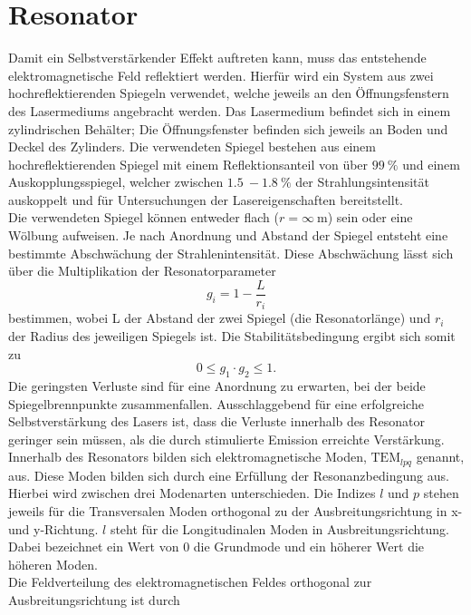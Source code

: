\section{Resonator}

Damit ein Selbstverstärkender Effekt auftreten kann, muss das entstehende elektromagnetische Feld reflektiert werden. Hierfür wird ein System aus zwei
hochreflektierenden Spiegeln verwendet, welche jeweils an den Öffnungsfenstern des Lasermediums angebracht werden. Das Lasermedium befindet sich in einem 
zylindrischen Behälter; Die Öffnungsfenster befinden sich jeweils an Boden und Deckel des Zylinders. Die verwendeten Spiegel bestehen aus einem hochreflektierenden
Spiegel mit einem Reflektionsanteil von über $\qty{99}{\%}$ und einem Auskopplungsspiegel, welcher zwischen $\qty{1.5}{}-\qty{1.8}{\%}$ der Strahlungsintensität
auskoppelt und für Untersuchungen der Lasereigenschaften bereitstellt.\\
Die verwendeten Spiegel können entweder flach ($r = \infty\qty{}{\metre}$) sein oder eine Wölbung aufweisen. Je nach Anordnung und Abstand der Spiegel entsteht
eine bestimmte Abschwächung der Strahlenintensität. Diese Abschwächung lässt sich über die Multiplikation der Resonatorparameter
\begin{equation}
    g_i = 1 - \frac{L}{r_i}
\end{equation}
bestimmen, wobei L der Abstand der zwei Spiegel (die Resonatorlänge) und $r_i$ der Radius des jeweiligen Spiegels ist. Die Stabilitätsbedingung ergibt sich somit zu 
\begin{equation}
    0 \leq g_1 \cdot g_2 \leq 1.
\end{equation}
Die geringsten Verluste sind für eine Anordnung zu erwarten, bei der beide Spiegelbrennpunkte zusammenfallen. Ausschlaggebend für eine erfolgreiche Selbstverstärkung
des Lasers ist, dass die Verluste innerhalb des Resonator geringer sein müssen, als die durch stimulierte Emission erreichte Verstärkung.\\
Innerhalb des Resonators bilden sich elektromagnetische Moden, $\mathrm{TEM}_{lpq}$ genannt, aus. Diese Moden bilden sich durch eine Erfüllung der Resonanzbedingung aus.
Hierbei wird zwischen drei Modenarten unterschieden. Die Indizes $l$ und $p$ stehen jeweils für die Transversalen Moden orthogonal zu der Ausbreitungsrichtung in x-
und y-Richtung. $l$ steht für die Longitudinalen Moden in Ausbreitungsrichtung. Dabei bezeichnet ein Wert von $0$ die Grundmode und ein höherer Wert die höheren Moden.\\
Die Feldverteilung des elektromagnetischen Feldes orthogonal zur Ausbreitungsrichtung ist durch
